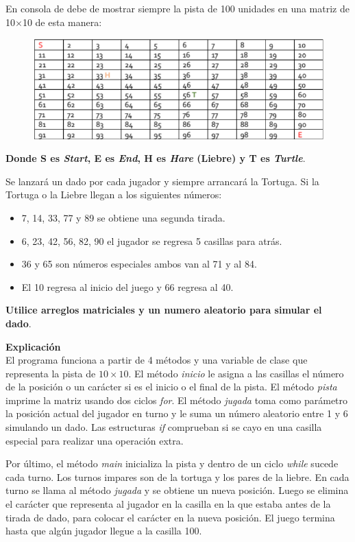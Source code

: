 \documentclass[11pt, twocolumn]{article}
\begin{document}
  En consola de debe de mostrar siempre la pista de 100 unidades en una matriz de 10$\times$10 de esta manera:

  \begin{figure}[ht]
    \includegraphics[width=\columnwidth, center]{Pista.png}
  \end{figure}

  \textbf{Donde S es \textit{Start}, E es \textit{End}, H es \textit{Hare} (Liebre) y T es \textit{Turtle}}.

  Se lanzará un dado por cada jugador y siempre arrancará la Tortuga. Si la Tortuga o la Liebre llegan a los siguientes números:

  \begin{itemize}
    \item 7, 14, 33, 77 y 89 se obtiene una segunda tirada.
    \item 6, 23, 42, 56, 82, 90 el jugador se regresa 5 casillas para atrás.
    \item 36 y 65 son números especiales ambos van al 71 y al 84.
    \item El 10 regresa al inicio del juego y 66 regresa al 40.
  \end{itemize}

  \textbf{Utilice arreglos matriciales y un numero aleatorio para simular el dado}.

  \textbf{Explicación} \\
  El programa funciona a partir de 4 métodos y una variable de clase que representa la pista de $10\times 10$. El método \textit{inicio} le asigna a las casillas el número de la posición o un carácter si es el inicio o el final de la pista. El método \textit{pista} imprime la matriz usando dos ciclos \textit{for}. El método \textit{jugada} toma como parámetro la posición actual del jugador en turno y le suma un número aleatorio entre 1 y 6 simulando un dado. Las estructuras \textit{if} comprueban si se cayo en una casilla especial para realizar una operación extra.

  Por último, el método \textit{main} inicializa la pista y dentro de un ciclo \textit{while} sucede cada turno. Los turnos impares son de la tortuga y los pares de la liebre. En cada turno se llama al método \textit{jugada} y se obtiene un nueva posición. Luego se elimina el carácter que representa al jugador en la casilla en la que estaba antes de la tirada de dado, para colocar el carácter en la nueva posición. El juego termina hasta que algún jugador llegue a la casilla 100. 
\end{document}
